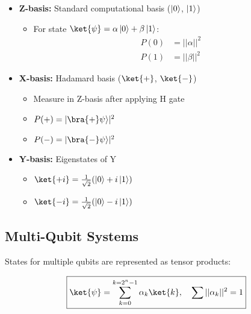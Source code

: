   \begin{itemize}
    \item \textbf{Z-basis:} Standard computational basis ($\left|0\right\rangle$, $\left|1\right\rangle$)

      \begin{itemize}[label={*}]
        \item For state $\ket{\psi} = \alpha\zero + \beta\one$:
          \begin{align*}
            P(0) &= ||\alpha||^2 \\
            P(1) &= ||\beta||^2
          \end{align*}
      \end{itemize}

    \item \textbf{X-basis:} Hadamard basis ($\ket{+}$, $\ket{-}$)

      \begin{itemize}[label={*}]
        \item Measure in Z-basis after applying H gate

        \item $P(+) = |\bra{+}\psi\rangle|^2$

        \item $P(-) = |\bra{-}\psi\rangle|^2$
      \end{itemize}

    \item \textbf{Y-basis:} Eigenstates of Y

      \begin{itemize}[label={*}]
        \item $\ket{+i} = \frac{1}{\sqrt{2}}(\zero + i\one)$

        \item $\ket{-i} = \frac{1}{\sqrt{2}}(\zero - i\one)$
      \end{itemize}

  \end{itemize}


  \subsection*{Multi-Qubit Systems}

  States for multiple qubits are represented as
  tensor products:

  \[
    \boxed{
      \ket{\psi} = \sum_{k=0}^{k = 2^n-1} \alpha_k \ket{k}, \quad \sum
      ||\alpha_k||^2 = 1
    }
  \]

